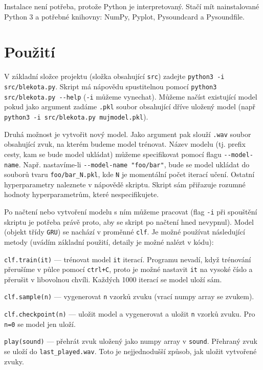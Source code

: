 \documentclass[a4]{article}
\begin{document}
Instalace není potřeba, protože Python je interpretovaný. Stačí mít nainstalované Python 3 a potřebné knihovny: NumPy, Pyplot, Pysoundcard a Pysoundfile.

\section{Použití}
V základní složce projektu (složka obsahující \verb|src|) zadejte \verb|python3 -i src/blekota.py|. Skript má nápovědu  spustitelnou pomocí \verb|python3 src/blekota.py --help| (\verb|-i| můžeme vynechat). Můžeme načíst existující model pokud jako argument zadáme \verb|.pkl| soubor obsahující dříve uložený model (např \verb|python3 -i src/blekota.py mujmodel.pkl|).

Druhá možnost je vytvořit nový model. Jako argument pak slouží \verb|.wav| soubor obsahující zvuk, na kterém budeme model trénovat. Název modelu (tj. prefix cesty, kam se bude model ukládat) můžeme specifikovat pomocí flagu \verb|--model-name|. Např. nastavíme-li \verb|--model-name "foo/bar"|, bude se model ukládat do souborů tvaru \verb|foo/bar_N.pkl|, kde \verb|N| je momentální počet iterací učení. Ostatní hyperparametry naleznete v nápovědě skriptu. Skript sám přiřazuje rozumné hodnoty hyperparametrům, které nespecifikujete.

Po načtení nebo vytvoření modelu s ním můžeme pracovat (flag \verb|-i| při spouštění skriptu je potřeba právě proto, aby se skript po načtení hned nevypnul). Model (objekt třídy \verb|GRU|) se nachází v proměnné \verb|clf|. Je možné používat následující metody (uvádím základní použití, detaily je možné nalézt v kódu):

\verb|clf.train(it)| --- trénovat model \verb|it| iterací. Programu nevadí, když trénování přerušíme v půlce pomocí \verb|ctrl+C|, proto je možné nastavit \verb|it| na vysoké číslo a přerušit v libovolnou chvíli. Každých 1000 iterací se model uloží sám.

\verb|clf.sample(n)| --- vygenerovat \verb|n| vzorků zvuku (vrací numpy array se zvukem).

\verb|clf.checkpoint(n)| --- uložit model a vygenerovat a uložit \verb|n| vzorků zvuku. Pro \verb|n=0| se model jen uloží.

\verb|play(sound)| --- přehrát zvuk uložený jako numpy array v \verb|sound|. Přehraný zvuk se uloží do \verb|last_played.wav|. Toto je nejjednodušší způsob, jak uložit vytvořené zvuky.
\end{document}
